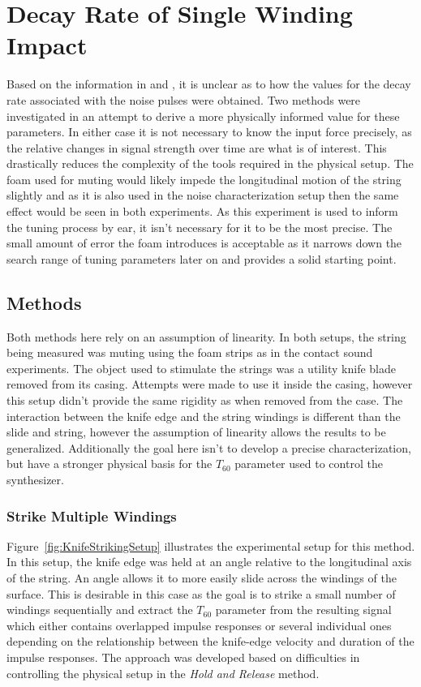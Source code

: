 \documentclass[../main.tex]{subfiles}
\begin{document}
\section{Decay Rate of Single Winding Impact}
\label{sec:DecayRateMeasurement}
Based on the information in  and , it is unclear as to how the values for the decay rate associated with the noise pulses were obtained. Two methods were investigated in an attempt to derive a more physically informed value for these parameters. In either case it is not necessary to know the input force precisely, as the relative changes in signal strength over time are what is of interest. This drastically reduces the complexity of the tools required in the physical setup. The foam used for muting would likely impede the longitudinal motion of the string slightly and as it is also used in the noise characterization setup then the same effect would be seen in both experiments. As this experiment is used to inform the tuning process by ear, it isn't necessary for it to be the most precise. The small amount of error the foam introduces is acceptable as it narrows down the search range of tuning parameters later on and provides a solid starting point.

\subsection{Methods}
Both methods here rely on an assumption of linearity. In both setups, the string being measured was muting using the foam strips as in the contact sound experiments. The object used to stimulate the strings was a utility knife blade removed from its casing. Attempts were made to use it inside the casing, however this setup didn't provide the same rigidity as when removed from the case. The interaction between the knife edge and the string windings is different than the slide and string, however the assumption of linearity  allows the results to be generalized. Additionally the goal here isn't to develop a precise characterization, but have a stronger physical basis for the $T_{60}$ parameter used to control the synthesizer. 

\subsubsection{Strike Multiple Windings}
Figure~\ref{fig:KnifeStrikingSetup} illustrates the experimental setup for this method. In this setup, the knife edge was held at an angle relative to the longitudinal axis of the string. An angle allows it to more easily slide across the windings of the surface. This is desirable in this case as the goal is to strike a small number of windings sequentially and extract the $T_{60}$ parameter from the resulting signal which either contains overlapped impulse responses or several individual ones depending on the relationship between the knife-edge velocity and duration of the impulse responses. The approach was developed based on difficulties in controlling the physical setup in the \emph{Hold and Release} method.
\end{document}

